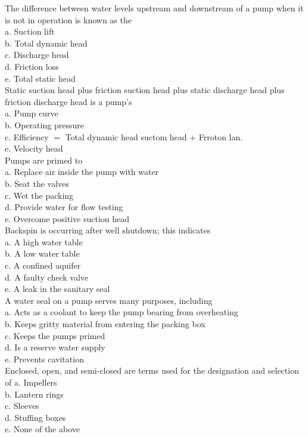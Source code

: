 The difference between water levels upstream and downstream of a pump when it is not in operation is known as the\\
a. Suction lift\\
b. Total dynamic head\\
c. Discharge head\\
d. Friction loss\\
e. Total static head\\

Static suction head plus friction suction head plus static discharge head plus friction discharge head is a pump's\\
a. Pump curve\\
b. Operating pressure\\
c. Efficiency $=$ Total dynamic head suctom head + Frroton lan.\\
e. Velocity head\\

Pumps are primed to\\
a. Replace air inside the pump with water\\
b. Seat the valves\\
c. Wet the packing\\
d. Provide water for flow testing\\
e. Overcome positive suction head\\

Backspin is occurring after well shutdown; this indicates\\
a. A high water table\\
b. A low water table\\
c. A confined aquifer\\
d. A faulty check valve\\
e. A leak in the sanitary seal\\

A water seal on a pump serves many purposes, including\\
a. Acts as a coolant to keep the pump bearing from overheating\\
b. Keeps gritty material from entering the packing box\\
c. Keeps the pumps primed\\
d. Is a reserve water supply\\
e. Prevents cavitation\\

Enclosed, open, and semi-closed are terms used for the designation and selection of a. Impellers\\
b. Lantern rings\\
c. Sleeves\\
d. Stuffing boxes\\
e. None of the above \\

